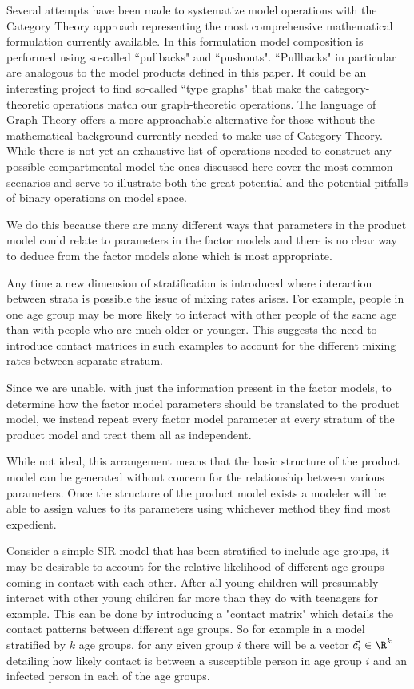 Several attempts have been made to systematize model operations with the Category Theory approach representing the most comprehensive mathematical formulation currently available. In this formulation model composition is performed using so-called “pullbacks" and “pushouts". “Pullbacks" in particular are analogous to the model products defined in this paper. It could be an interesting project to find so-called “type graphs" that make the category-theoretic operations match our graph-theoretic operations. The language of Graph Theory offers a more approachable alternative for those without the mathematical background currently needed to make use of Category Theory. While there is not yet an exhaustive list of operations needed to construct any possible compartmental model the ones discussed here cover the most common scenarios and serve to illustrate both the great potential and the potential pitfalls of binary operations on model space.


We do this because there are many different ways that parameters in the product model could relate to parameters in the factor models and there is no clear way to deduce from the factor models alone which is most appropriate.

 

Any time a new dimension of stratification is introduced where interaction between strata is possible the issue of mixing rates arises. For example, people in one age group may be more likely to interact with other people of the same age than with people who are much older or younger. This suggests the need to introduce contact matrices in such examples to account for the different mixing rates between separate stratum.

Since we are unable, with just the information present in the factor models, to determine how the factor model parameters should be translated to the product model, we instead repeat every factor model parameter at every stratum of the product model and treat them all as independent.

While not ideal, this arrangement means that the basic structure of the product model can be generated without concern for the relationship between various parameters. Once the structure of the product model exists a modeler will be able to assign values to its parameters using whichever method they find most expedient.

Consider a simple SIR model that has been stratified to include age groups, it may be desirable to account for the relative likelihood of different age groups coming in contact with each other. After all young children will presumably interact with other young children far more than they do with teenagers for example. This can be done by introducing a "contact matrix" which details the contact patterns between different age groups. So for example in a model stratified by $k$ age groups, for any given group $i$ there will be a vector $\vec{c_i}\in \R^k$ detailing how likely contact is between a susceptible person in age group $i$ and an infected person in each of the age groups.  


